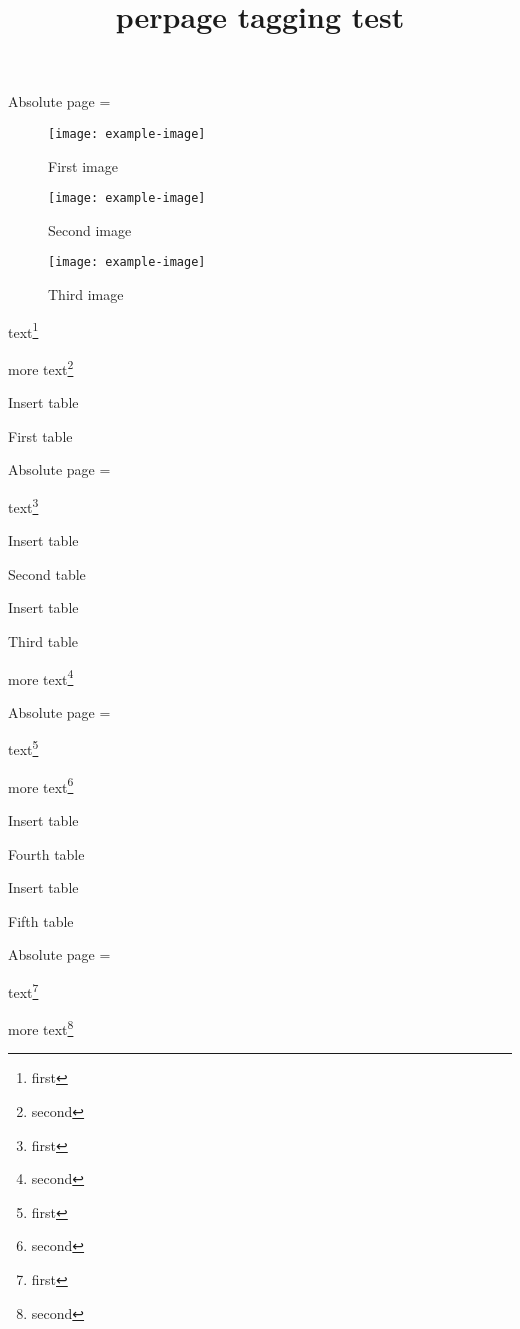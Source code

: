 \documentclass[twocolumn]{article}
\title{perpage tagging test}
\begin{document}
Absolute page = \theabspage
\begin{figure*}
\texttt{[image: example-image]}
\caption{First image}
\end{figure*}
\begin{figure}
\texttt{[image: example-image]}
\caption{Second image}
\end{figure}
\begin{figure*}
\texttt{[image: example-image]}
\caption{Third image}
\end{figure*}
text\footnote{first}

more text\footnote{second}

\begin{table}
Insert table
\caption{First table}
\end{table}

\newpage
Absolute page = \theabspage

text\footnote{first}

\begin{table*}
Insert table
\caption{Second table}
\end{table*}
\begin{table}
Insert table
\caption{Third table}
\end{table}

more text\footnote{second}

\newpage
Absolute page = \theabspage

text\footnote{first}

more text\footnote{second}

\begin{table*}
Insert table
\caption{Fourth table}
\end{table*}
\begin{table}
Insert table
\caption{Fifth table}
\end{table}

\newpage
Absolute page = \theabspage

text\footnote{first}

more text\footnote{second}
\end{document}

